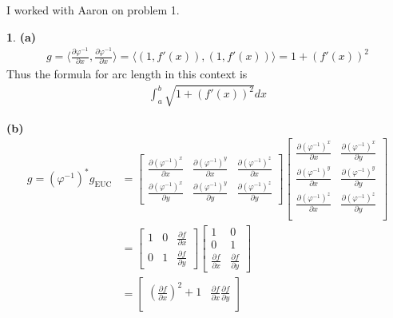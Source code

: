 \documentclass[10.5pt]{article}
\theoremstyle{definition}
\newtheorem{pb}{}
\newcommand{\gen}[1]{\langle #1 \rangle}
\begin{document}
    I worked with Aaron on problem 1.
    \begin{pb}
        \textbf{(a)}
        \begin{align*}
            g = \gen{\frac{\partial \varphi^{-1}}{\partial x},\frac{\partial \varphi^{-1}}{\partial x}} = \gen{(1,f'(x)),(1,f'(x))} = 1 + (f'(x))^2
        \end{align*}
        Thus the formula for arc length in this context is
        \begin{align*}
            \int_a^b \sqrt{1 + (f'(x))^2}dx
        \end{align*}

        \textbf{(b)}
        \begin{align*}
            g = (\varphi^{-1})^*g_{\text{EUC}} &= \begin{bmatrix}
                \frac{\partial (\varphi^{-1})^x}{\partial x} & \frac{\partial (\varphi^{-1})^y}{\partial x} & \frac{\partial (\varphi^{-1})^z}{\partial x} \\
                \frac{\partial (\varphi^{-1})^x}{\partial y} & \frac{\partial (\varphi^{-1})^y}{\partial y} & \frac{\partial (\varphi^{-1})^z}{\partial y}
            \end{bmatrix}
            \begin{bmatrix}
                \frac{\partial (\varphi^{-1})^x}{\partial x} & \frac{\partial (\varphi^{-1})^x}{\partial y} \\
                \frac{\partial (\varphi^{-1})^y}{\partial x} & \frac{\partial (\varphi^{-1})^y}{\partial y} \\
                \frac{\partial (\varphi^{-1})^z}{\partial x} & \frac{\partial (\varphi^{-1})^z}{\partial y} \\
            \end{bmatrix} \\
            &= \begin{bmatrix} 1 & 0 & \frac{\partial f}{\partial x} \\
                0 & 1 & \frac{\partial f}{\partial y} \end{bmatrix} 
                \begin{bmatrix} 1 & 0 \\ 0 & 1 \\ \frac{\partial f}{\partial x} & \frac{\partial f}{\partial y} \end{bmatrix} \\
                &= \begin{bmatrix} \left(\frac{\partial f}{\partial x}\right)^2 + 1 & \frac{\partial f}{\partial x}\frac{\partial f}{\partial y} \\

\end{bmatrix}
\end{align*}
\end{pb}
\end{document}
